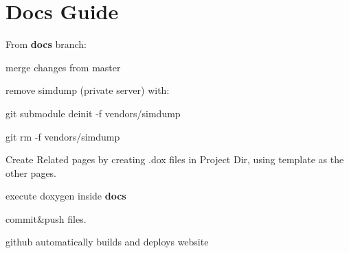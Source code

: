 \chapter{Docs Guide}
\hypertarget{docs_guide}{}\label{docs_guide}
From {\bfseries{docs}} branch\+:


\begin{DoxyItemize}
\item merge changes from master
\item remove simdump (private server) with\+:
\begin{DoxyItemize}
\item git submodule deinit -\/f vendors/simdump
\item git rm -\/f vendors/simdump
\end{DoxyItemize}
\item Create Related pages by creating {\ttfamily .dox} files in Project Dir, using template as the other pages.
\item execute {\ttfamily doxygen} inside {\bfseries{docs}}
\item commit\&push files.
\item github automatically builds and deploys website 
\end{DoxyItemize}